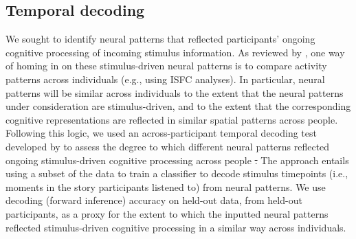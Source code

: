 \documentclass[english]{article}
\providecommand{\DIFaddtex}[1]{{\protect\color{blue}\uwave{#1}}} %
\providecommand{\DIFdeltex}[1]{{\protect\color{red}\sout{#1}}}                      %
\providecommand{\DIFaddbegin}{} %
\providecommand{\DIFaddend}{} %
\providecommand{\DIFdelbegin}{} %
\providecommand{\DIFdelend}{} %
\providecommand{\DIFadd}[1]{\texorpdfstring{\DIFaddtex{#1}}{#1}} %
\providecommand{\DIFdel}[1]{\texorpdfstring{\DIFdeltex{#1}}{}} %
\newcommand{\DIFscaledelfig}{0.5}
\newlength{\DIFdelgraphicswidth} %
\newlength{\DIFdelgraphicsheight} %
\newcommand{\DIFaddincludegraphics}[2][]{{\color{blue}\fbox{\DIFOincludegraphics[#1]{#2}}}} %
\newcommand{\DIFdelincludegraphics}[2][]{%
\sbox{\DIFdelgraphicsbox}{\DIFOincludegraphics[#1]{#2}}%
\settoboxwidth{\DIFdelgraphicswidth}{\DIFdelgraphicsbox} %
\settoboxtotalheight{\DIFdelgraphicsheight}{\DIFdelgraphicsbox} %
\scalebox{\DIFscaledelfig}{%
\parbox[b]{\DIFdelgraphicswidth}{\usebox{\DIFdelgraphicsbox}\\[-\baselineskip] \rule{\DIFdelgraphicswidth}{0em}}\llap{\resizebox{\DIFdelgraphicswidth}{\DIFdelgraphicsheight}{%
\setlength{\unitlength}{\DIFdelgraphicswidth}%
\begin{picture}(1,1)%
\thicklines\linethickness{2pt} %
{\color[rgb]{1,0,0}\put(0,0){\framebox(1,1){}}}%
{\color[rgb]{1,0,0}\put(0,0){\line( 1,1){1}}}%
{\color[rgb]{1,0,0}\put(0,1){\line(1,-1){1}}}%
\end{picture}%
}\hspace*{3pt}}} %
} %
\DeclareRobustCommand{\DIFaddbegin}{\DIFOaddbegin \let\includegraphics\DIFaddincludegraphics} %
\DeclareRobustCommand{\DIFaddend}{\DIFOaddend \let\includegraphics\DIFOincludegraphics} %
\DeclareRobustCommand{\DIFdelbegin}{\DIFOdelbegin \let\includegraphics\DIFdelincludegraphics} %
\DeclareRobustCommand{\DIFdelend}{\DIFOaddend \let\includegraphics\DIFOincludegraphics} %
\begin{document}
\subsection*{Temporal decoding}
We sought to identify neural patterns that reflected participants'
ongoing cognitive processing of incoming stimulus information.  As
reviewed by \cite{SimoEtal16}, one way of homing in on these
stimulus-driven neural patterns is to compare activity patterns across
individuals (e.g., using ISFC analyses).  In particular, neural
patterns will be similar across individuals to the extent that the
neural patterns under consideration are stimulus-driven, and to the
extent that the corresponding cognitive representations are reflected
in similar spatial patterns across people\DIFaddbegin \DIFadd{~}\citep[also see][]{SimoChan20}\DIFaddend .  Following this logic, we
used an across-participant temporal decoding test developed by
\cite{MannEtal18} to assess the degree to which different neural
patterns reflected ongoing stimulus-driven cognitive processing across
people \DIFdelbegin \DIFdel{.  }\DIFdelend \DIFaddbegin \DIFadd{(Fig.~\ref{fig:pipeline}).  }\DIFaddend The approach entails using a subset of the data to train a
classifier to decode stimulus timepoints (i.e., moments in the story
participants listened to) from neural patterns.  We use decoding
(forward inference) accuracy on held-out data, from held-out
participants, as a proxy for the extent to which the inputted neural
patterns reflected stimulus-driven cognitive processing in a similar
way across individuals.
\end{document}
